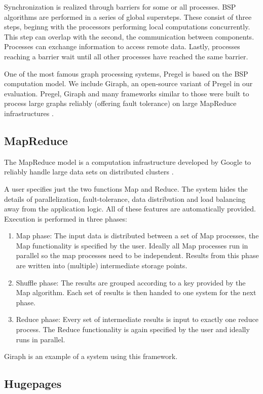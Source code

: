 Synchronization is realized through barriers for some or all processes.
BSP algorithms are performed in a series of global supersteps. These consist of three steps, beginng with the processors performing local computations concurrently.
This step can overlap with the second, the communication between components. Processes can exchange information to access remote data.
Lastly, processes reaching a barrier wait until all other processes have reached the same barrier.

One of the most famous graph processing systems, Pregel \cite{pregel} is based on the BSP computation model. We include Giraph, an open-source variant of Pregel in our evaluation.
Pregel, Giraph and many frameworks similar to those were built to process large graphs reliably (offering fault tolerance) on large MapReduce infrastructures \cite{Giraph,graphx,powergraph}.

\subsection{MapReduce}
The MapReduce model is a computation infrastructure developed by Google to reliably handle large data sets on distributed clusters \cite{mapreduce}.

A user specifies just the two functions Map and Reduce.
The system hides the details of parallelization, fault-tolerance, data distribution and load balancing away from the application logic.
All of these features are automatically provided.
Execution is performed in three phases:
\begin{enumerate}
	\item Map phase: The input data is distributed between a set of Map processes, the Map functionality is specified by the user. Ideally all Map processes run in parallel so the map processes need to be independent. Results from this phase are written into (multiple) intermediate storage points.
	\item Shuffle phase: The results are grouped according to a key provided by the Map algorithm. Each set of results is then handed to one system for the next phase.
	\item Reduce phase: Every set of intermediate results is input to exactly one reduce process. The Reduce functionality is again specified by the user and ideally runs in parallel.
\end{enumerate}
Giraph \cite{Giraph} is an example of a system using this framework.

\subsection{Hugepages}
\cite{hugepages}
